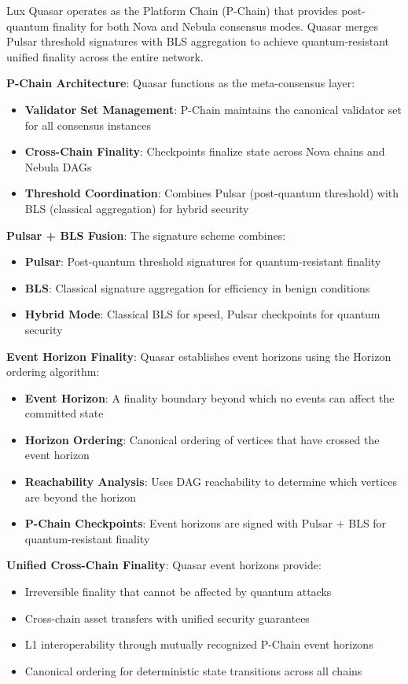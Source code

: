 Lux Quasar operates as the Platform Chain (P-Chain) that provides post-quantum finality for both Nova and Nebula consensus modes. Quasar merges Pulsar threshold signatures with BLS aggregation to achieve quantum-resistant unified finality across the entire network.

\textbf{P-Chain Architecture}: Quasar functions as the meta-consensus layer:
\begin{itemize}
\item \textbf{Validator Set Management}: P-Chain maintains the canonical validator set for all consensus instances
\item \textbf{Cross-Chain Finality}: Checkpoints finalize state across Nova chains and Nebula DAGs
\item \textbf{Threshold Coordination}: Combines Pulsar (post-quantum threshold) with BLS (classical aggregation) for hybrid security
\end{itemize}

\textbf{Pulsar + BLS Fusion}: The signature scheme combines:
\begin{itemize}
\item \textbf{Pulsar}: Post-quantum threshold signatures for quantum-resistant finality
\item \textbf{BLS}: Classical signature aggregation for efficiency in benign conditions
\item \textbf{Hybrid Mode}: Classical BLS for speed, Pulsar checkpoints for quantum security
\end{itemize}

\textbf{Event Horizon Finality}: Quasar establishes event horizons using the Horizon ordering algorithm:
\begin{itemize}
\item \textbf{Event Horizon}: A finality boundary beyond which no events can affect the committed state
\item \textbf{Horizon Ordering}: Canonical ordering of vertices that have crossed the event horizon
\item \textbf{Reachability Analysis}: Uses DAG reachability to determine which vertices are beyond the horizon
\item \textbf{P-Chain Checkpoints}: Event horizons are signed with Pulsar + BLS for quantum-resistant finality
\end{itemize}

\textbf{Unified Cross-Chain Finality}: Quasar event horizons provide:
\begin{itemize}
\item Irreversible finality that cannot be affected by quantum attacks
\item Cross-chain asset transfers with unified security guarantees  
\item L1 interoperability through mutually recognized P-Chain event horizons
\item Canonical ordering for deterministic state transitions across all chains
\end{itemize}

